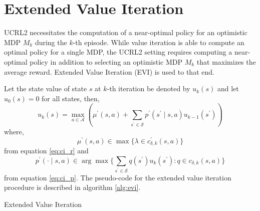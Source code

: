 \section{Extended Value Iteration}

UCRL2 necessitates the computation of a near-optimal policy for an optimistic MDP $M_k$ during the $k$-th episode.
While value iteration is able to compute an optimal policy for a single MDP, the UCRL2 setting requires computing a near-optimal policy in addition to selecting an optimistic MDP $M_k$ that maximizes the average reward.
Extended Value Iteration (EVI) is used to that end.

Let the state value of state $s$ at $k$-th iteration be denoted by $u_k(s)$ and let $u_0(s) = 0$ for all states, then,
\begin{equation}
    u_k(s) = \max_{a \in \mathcal{A}} \left( \mu^\prime(s,a) + \sum_{s^\prime \in \mathcal{S}} {p^\prime(s^\prime \mid s, a) u_{k-1}(s^\prime)} \right)
\end{equation}
where, 
$$\mu^\prime(s,a) \in \max \{ \lambda \in c^\prime_{\delta, k} (s,a) \}$$
from equation \ref{eq:ci_r} and 
$$p^\prime(\cdot \mid s, a) \in \arg\max \{ \sum_{s^\prime \in \mathcal{S}} {q(s^\prime) u_k(s^\prime) : q \in c_{\delta, k} (s,a)} \}$$ 
from equation  \ref{eq:ci_p}.
The pseudo-code for the extended value iteration procedure is described in algorithm \ref{alg:evi}.

\begin{algorithm}
\caption{Extended Value Iteration}\label{alg:evi}



\BlankLine
{}
\BlankLine
{}
\end{algorithm}

